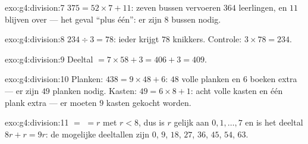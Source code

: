 \begin{solution}{exo:g4:division:7}
$375 = 52 \times 7 + 11$: zeven bussen vervoeren $364$ leerlingen, en $11$
blijven over --- het geval ``plus één'': er zijn $8$ bussen nodig.
\end{solution}

\begin{solution}{exo:g4:division:8}
$234 \div 3 = 78$: ieder krijgt $78$ knikkers. Controle:
$3 \times 78 = 234$.
\end{solution}

\begin{solution}{exo:g4:division:9}
Deeltal $= 7 \times 58 + 3 = 406 + 3 = 409$.
\end{solution}

\begin{solution}{exo:g4:division:10}
Planken: $438 = 9 \times 48 + 6$: $48$ volle planken en $6$ boeken extra
--- er zijn $49$ planken nodig. Kasten: $49 = 6 \times 8 + 1$: acht volle
kasten en één plank extra --- er moeten $9$ kasten gekocht worden.
\end{solution}

\begin{solution}{exo:g4:division:11}
 $=$  $= r$ met $r < 8$, dus is $r$ gelijk aan
$0, 1, \dots, 7$ en is het deeltal $8r + r = 9r$: de mogelijke deeltallen
zijn $0$, $9$, $18$, $27$, $36$, $45$, $54$, $63$.
\end{solution}

